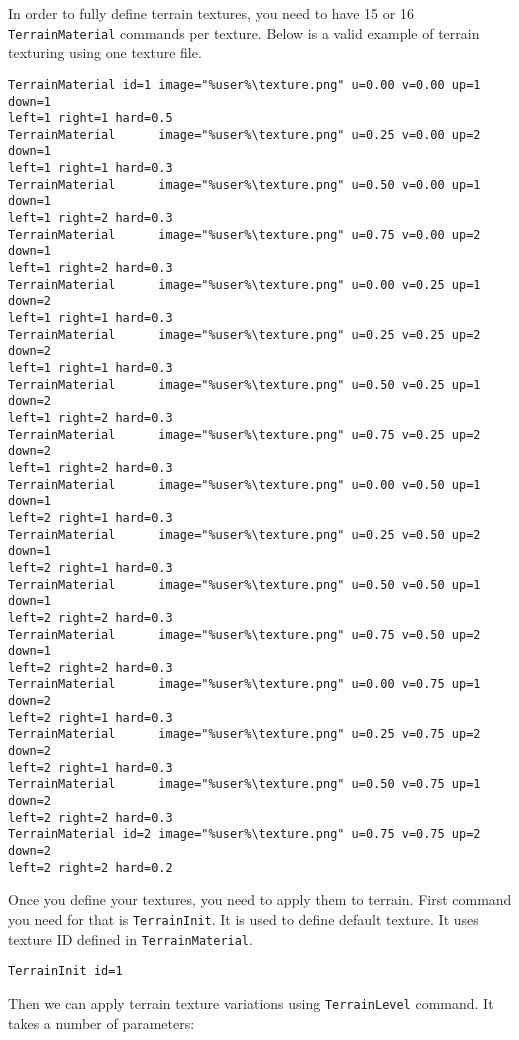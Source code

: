 In order to fully define terrain textures, you need to have 15 or 16 \texttt{TerrainMaterial} commands per texture. Below is a valid example of terrain texturing using one texture file.

\begin{verbatim}
TerrainMaterial id=1 image="%user%\texture.png" u=0.00 v=0.00 up=1 down=1
left=1 right=1 hard=0.5
TerrainMaterial      image="%user%\texture.png" u=0.25 v=0.00 up=2 down=1
left=1 right=1 hard=0.3
TerrainMaterial      image="%user%\texture.png" u=0.50 v=0.00 up=1 down=1
left=1 right=2 hard=0.3
TerrainMaterial      image="%user%\texture.png" u=0.75 v=0.00 up=2 down=1
left=1 right=2 hard=0.3
TerrainMaterial      image="%user%\texture.png" u=0.00 v=0.25 up=1 down=2
left=1 right=1 hard=0.3
TerrainMaterial      image="%user%\texture.png" u=0.25 v=0.25 up=2 down=2
left=1 right=1 hard=0.3
TerrainMaterial      image="%user%\texture.png" u=0.50 v=0.25 up=1 down=2
left=1 right=2 hard=0.3
TerrainMaterial      image="%user%\texture.png" u=0.75 v=0.25 up=2 down=2
left=1 right=2 hard=0.3
TerrainMaterial      image="%user%\texture.png" u=0.00 v=0.50 up=1 down=1
left=2 right=1 hard=0.3
TerrainMaterial      image="%user%\texture.png" u=0.25 v=0.50 up=2 down=1
left=2 right=1 hard=0.3
TerrainMaterial      image="%user%\texture.png" u=0.50 v=0.50 up=1 down=1
left=2 right=2 hard=0.3
TerrainMaterial      image="%user%\texture.png" u=0.75 v=0.50 up=2 down=1
left=2 right=2 hard=0.3
TerrainMaterial      image="%user%\texture.png" u=0.00 v=0.75 up=1 down=2
left=2 right=1 hard=0.3
TerrainMaterial      image="%user%\texture.png" u=0.25 v=0.75 up=2 down=2
left=2 right=1 hard=0.3
TerrainMaterial      image="%user%\texture.png" u=0.50 v=0.75 up=1 down=2
left=2 right=2 hard=0.3
TerrainMaterial id=2 image="%user%\texture.png" u=0.75 v=0.75 up=2 down=2
left=2 right=2 hard=0.2
\end{verbatim}

Once you define your textures, you need to apply them to terrain. First command you need for that is \texttt{TerrainInit}. It is used to define default texture. It uses texture ID defined in \texttt{TerrainMaterial}.

\begin{verbatim}
TerrainInit id=1
\end{verbatim}

Then we can apply terrain texture variations using \texttt{TerrainLevel} command. It takes a number of parameters:

